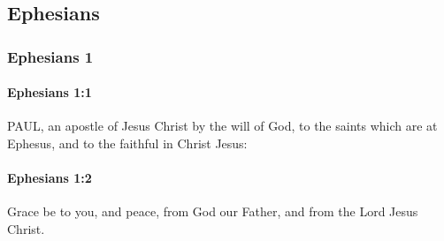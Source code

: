 \subsection{Ephesians}
	\label{EPHESIANS}
	
	\subsubsection{Ephesians 1} %
		\label{EPHESIANS-1}
		
		\paragraph{Ephesians 1:1} %
			\label{EPHESIANS-1-1}

			PAUL, an apostle of Jesus Christ by the will of God, to the saints which are at Ephesus, and to the faithful in Christ Jesus:

			\begin{framed}
			\scriptsize
				\begin{compactdesc}
					\item[SBLG] 
				\end{compactdesc}
			\end{framed}

		\paragraph{Ephesians 1:2} %
			\label{EPHESIANS-1-2}

			Grace be to you, and peace, from God our Father, and from the Lord Jesus Christ.

